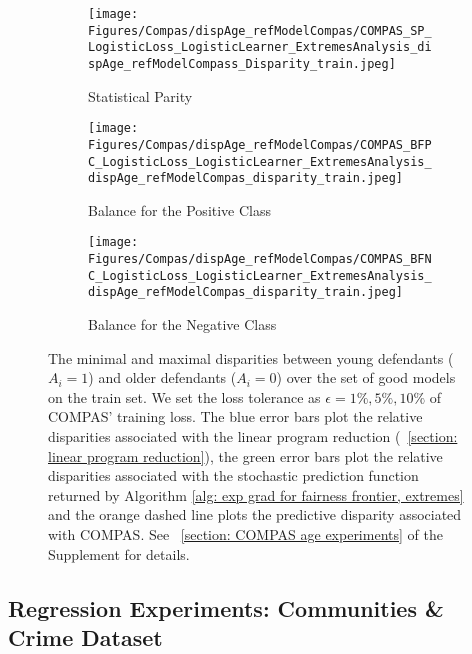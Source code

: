 \documentclass{article}
\begin{document}
\begin{figure}
     \centering
     \begin{subfigure}[b]{0.4\textwidth}
         \centering
         \texttt{[image: Figures/Compas/dispAge\_refModelCompas/COMPAS\_SP\_LogisticLoss\_LogisticLearner\_ExtremesAnalysis\_dispAge\_refModelCompass\_Disparity\_train.jpeg]}
         \caption{Statistical Parity}
         \label{fig: Compas age ref model compas SP train}
     \end{subfigure}
     \hfill
     \begin{subfigure}[b]{0.4\textwidth}
         \centering
         \texttt{[image: Figures/Compas/dispAge\_refModelCompas/COMPAS\_BFPC\_LogisticLoss\_LogisticLearner\_ExtremesAnalysis\_dispAge\_refModelCompas\_disparity\_train.jpeg]}
         \caption{Balance for the Positive Class}
         \label{fig: Compas age ref model compas BFPC train}
     \end{subfigure}
     \hfill
     \begin{subfigure}[b]{0.4\textwidth}
         \centering
         \texttt{[image: Figures/Compas/dispAge\_refModelCompas/COMPAS\_BFNC\_LogisticLoss\_LogisticLearner\_ExtremesAnalysis\_dispAge\_refModelCompas\_disparity\_train.jpeg]}
         \caption{Balance for the Negative Class}
         \label{fig: Compas age ref model compas BFNC train}
     \end{subfigure}
\caption{The minimal and maximal disparities between young defendants ($A_i = 1$) and older defendants ($A_i = 0$) over the set of good models on the train set. We set the loss tolerance as $\epsilon = 1\%, 5\%, 10\%$ of COMPAS' training loss. The blue error bars plot the relative disparities associated with the linear program reduction (\textsection~\ref{section: linear program reduction}), the green error bars plot the relative disparities associated with the stochastic prediction function returned by Algorithm \ref{alg: exp grad for fairness frontier, extremes} and the orange dashed line plots the predictive disparity associated with COMPAS. See \textsection~\ref{section: COMPAS age experiments} of the Supplement for details.}
    \label{fig: Compas age ref model compas train}
\end{figure}

\subsection{Regression Experiments: Communities \& Crime Dataset}\label{section: regression experiments, communities & crime dataset}
\end{document}
